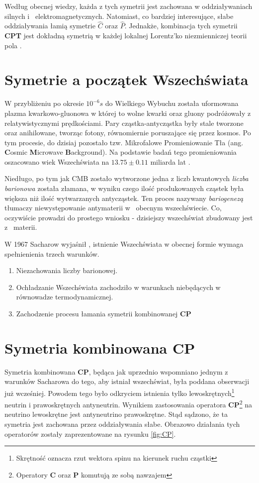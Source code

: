 Według obecnej wiedzy, każda z tych symetrii jest zachowana w oddziaływaniach silnych i~ elektromagnetycznych. Natomiast, co bardziej interesujące, słabe oddziaływania łamią symetrie \textbf{$\hat{C}$} oraz  \textbf{$\hat{P}$}. Jednakże, kombinacja tych symetrii \textbf{CPT} jest dokładną symetrią w każdej lokalnej Lorentz'ko niezmienniczej teorii pola \cite{symmetry}.

\section{Symetrie a początek Wszechświata}
W przybliżeniu po okresie $10^{-6}s$ do Wielkiego Wybuchu została uformowana plazma kwarkowo-gluonowa w której to wolne kwarki oraz gluony podróżowały z relatywistycznymi prędkościami. Pary cząstka-antycząstka były stale tworzone oraz anihilowane, tworząc fotony, równomiernie poruszające się przez kosmos. Po tym procesie, do dzisiaj pozostało tzw. Mikrofalowe Promieniowanie Tła (ang. \textbf{C}osmic \textbf{M}icrowave \textbf{B}ackground). Na podstawie badań tego promieniowania oszacowano wiek Wszechświata na $13.75 \pm 0.11$ miliarda lat \cite{CMB}.

Niedługo, po tym jak CMB zostało wytworzone jedna z liczb kwantowych \textit{liczba barionowa} została złamana, w wyniku czego ilość produkowanych cząstek była większa niż ilość wytwarzanych antycząstek. Ten proces nazywany \textit{bariogenezą} tłumaczy niewystępowanie antymaterii w~ obecnym wszechświecie. Co, oczywiście prowadzi do prostego wniosku - dzisiejszy wszechświat zbudowany jest z~ materii.

W 1967 Sacharow  wyjaśnił \cite{Sacharow}, istnienie Wszechświata w obecnej formie wymaga spełnienienia trzech warunków.
\begin{enumerate}
\item Niezachowania liczby barionowej. 
\item Ochładzanie Wszechświata zachodziło w warunkach niebędących w równowadze termodynamicznej. 
\item Zachodzenie procesu łamania symetrii kombinowanej \textbf{CP} 
\end{enumerate}

\section{Symetria kombinowana \textbf{CP}}
Symetria kombinowana \textbf{CP}, będąca jak uprzednio wspomniano jednym z warunków Sacharowa do tego, aby istniał wszechświat, była poddana obserwacji już wcześniej. Powodem tego było odkryciem istnienia tylko lewoskrętnych\footnote{Skrętność oznacza rzut wektora spinu na kierunek ruchu cząstki} neutrin i prawoskrętnych antyneutrin. Wynikiem zastosowania operatora \textbf{CP}\footnote{Operatory \textbf{C} oraz \textbf{P} komutują ze sobą nawzajem} na neutrino lewoskrętne jest antyneutrino prawoskrętne. Stąd sądzono, że ta symetria jest zachowana przez oddziaływania słabe. Obrazowo działania tych operatorów zostały zaprezentowane na rysunku \ref{fig:CP}.



